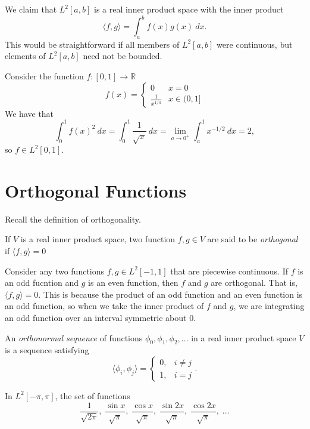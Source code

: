 \documentclass[11pt]{article}
\theoremstyle{definition}
\newcommand{\R}{\mathbb{R}}                      %
\begin{document}
We claim that $L^2[a,b]$ is a real inner product space with the inner product
$$\langle f, g \rangle = \int_a^b f(x)g(x)~dx.$$
This would be straightforward if all members of $L^2[a,b]$ were continuous, but elements of $L^2[a,b]$ need not be bounded. 

\ex Consider the function $f:[0,1]\to \R$
$$f(x) = \begin{cases}

0 & x = 0\\

\frac{1}{x^{1/4}} & x \in (0, 1]

\end{cases}$$
We have that
$$
\int_0^1 f(x)^2 ~dx =\int_0^1 \frac{1}{\sqrt{x}} ~dx = \lim_{a\to0^+} \int_a^1 x^{-1/2} ~dx = 2,
$$
so $f\in L^2[0,1]$.
\section{Orthogonal Functions}
Recall the definition of orthogonality.
\begin{mdframed}[backgroundcolor = blue!10]
\vspace{+0.1cm}
 If $V$ is a real inner product space, two function $f,g\in V$ are said to be \textit{orthogonal} if $\langle f,g\rangle =0$
\end{mdframed}
\ex Consider any two functions $f,g\in L^2[-1,1]$ that are piecewise continuous. If $f$ is an odd fucntion and $g$ is an even function, then $f$ and $g$ are orthogonal. That is, $\langle f,g \rangle =0$. This is because the product of an odd function and an even function is an odd function, so when we take the inner product of $f$ and $g$, we are integrating an odd function over an interval symmetric about 0.

\begin{mdframed}[backgroundcolor = blue!10]
\vspace{+0.1cm}
 An \textit{orthonormal sequence} of functions $\phi_0,\phi_1,\phi_2,\dots$ in a real inner product space $V$ is a sequence satisfying
$$
    \langle \phi_i,\phi_j \rangle =\begin{cases}
        0, & i\neq j\\
        1, & i=j
    \end{cases}.
$$
\end{mdframed}

\ex In $L^2[-\pi,\pi]$, the set of functions
$$
\frac{1}{\sqrt{2\pi}},\;\frac{\sin{x}}{\sqrt{\pi}},\;\frac{\cos{x}}{\sqrt{\pi}},\;\frac{\sin{2x}}{\sqrt{\pi}},\;\frac{\cos{2x}}{\sqrt{\pi}},\;\dots
$$
\end{document}
